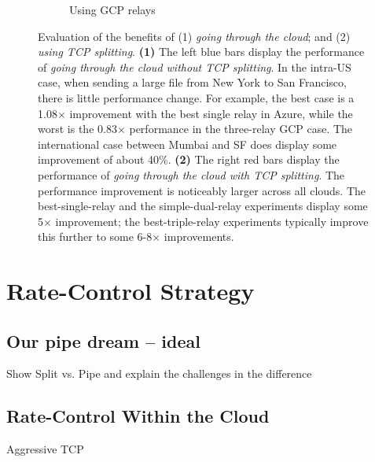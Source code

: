 \documentclass[sigconf,usenames,dvipsnames,geometry]{acmart}
\newcommand{\mycomm}[3]{{\color{#2} \textbf{[#1: #3]}}}
\newcommand{\mycomm}[3]{}
\newcommand{\IK}[1]{\mycomm{IK}{blue}{#1}}
\begin{document}
\begin{figure}[t!]
\begin{subfigure}{.32\textwidth}
    \caption{Using GCP relays}
    \label{fig:must-split-gcp}
\end{subfigure}
\caption{Evaluation of the benefits of (1) \textit{going through the cloud}; and (2) \textit{using TCP splitting}. \textbf{(1)} The left blue bars display the performance of \textit{going through the cloud without TCP splitting}. In the intra-US case, when sending a large file from New York to San Francisco, there is little performance change. For example, the best case is a 1.08$\times$ improvement with the best single relay in Azure, while the worst is the 0.83$\times$ performance in the three-relay GCP case. The international case between Mumbai and SF does display some improvement of about 40\%. \textbf{(2)} The right red bars display the performance of \textit{going through the cloud with TCP splitting}. The performance improvement is noticeably larger across all clouds. The best-single-relay and the simple-dual-relay experiments display some 5$\times$ improvement; the best-triple-relay experiments typically improve this further to some 6-8$\times$ improvements.
}
\label{fig:must-split}
\end{figure}







\section{Rate-Control Strategy}

\subsection{Our pipe dream -- ideal}

Show Split vs. Pipe and explain the challenges in the difference





\subsection{Rate-Control Within the Cloud}
Aggressive TCP
\end{document}
